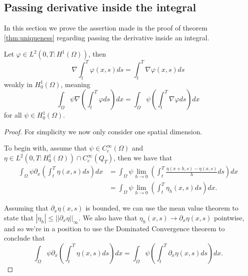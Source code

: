 \documentclass[11pt, a4paper]{article}
\begin{document}
\newpage
\begin{appendix}
\section{Passing derivative inside the integral}
\label{sec:derivative}
In this section we prove the assertion made in the proof of theorem \ref{thm:uniqueness} regarding passing the derivative inside an integral.

\begin{lemma}
Let $\varphi \in L^2(0,T: H^1(\Omega))$, then 
\begin{equation}
\label{diff_int}
	\nabla \int_t^T \varphi(x,s)ds = \int_t^T \nabla\varphi(x,s)ds
\end{equation}
weakly in $H^1_0(\Omega)$, meaning 
\begin{equation*}
\int_\Omega \psi \nabla \left(\int_t^T \varphi ds \right) dx = \int_\Omega \psi \left(\int_t^T \nabla \varphi ds \right) dx
\end{equation*}
for all $\psi \in H^1_0(\Omega)$.
\end{lemma}

\begin{proof}

For simplicity we now only consider one spatial dimension.

To begin with, assume that $\psi \in C^{\infty}_c(\Omega)$ and $\eta \in L^2(0,T: H_0^1(\Omega))\cap C^\infty_c(Q_T)$, then we have that
\begin{align*}
\int_{\Omega}\psi \partial_x\left(\int_t^T \eta(x,s) ds\right)dx &= \int_{\Omega}\psi \lim_{h \to 0}\left(\int_t^T \frac{\eta(x+h,s)-\eta(x,s)}{h} ds\right)dx\\
&= \int_{\Omega}\psi \lim_{h \to 0}\left(\int_t^T \eta_h(x,s) ds\right)dx.
\end{align*}

Assuming that $\partial_x \eta(x,s)$ is bounded, we can use the mean value theorem to state that $|\eta_h| \leq  ||\partial_x \eta||_\infty$. We also have that $\eta_h(x,s) \to \partial_x \eta(x,s)$ pointwise, and so we're in a position to use the Dominated Convergence theorem to conclude that
\begin{equation}
\label{results_diff_first}
\int_{\Omega}\psi \partial_x\left(\int_t^T \eta(x,s) ds\right)dx = \int_{\Omega}\psi \left(\int_t^T \partial_x\eta(x,s) ds\right)dx.
\end{equation}


\end{proof}
\end{appendix}
\end{document}
